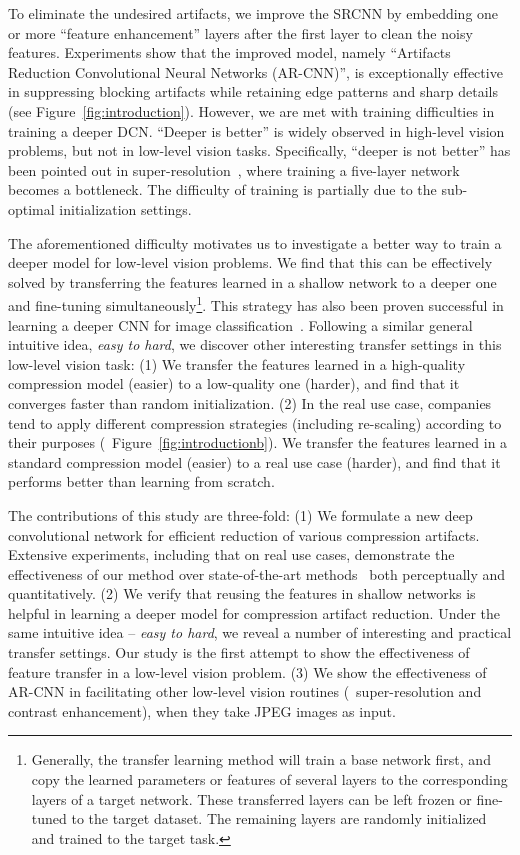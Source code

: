 \documentclass[10pt,twocolumn,letterpaper]{article}
\begin{document}
To eliminate the undesired artifacts, we improve the SRCNN by embedding one or more ``feature enhancement'' layers after the first layer to clean the noisy features. Experiments show that the improved model, namely ``Artifacts Reduction Convolutional Neural Networks (AR-CNN)'', is exceptionally effective in suppressing blocking artifacts while retaining edge patterns and sharp details (see Figure~\ref{fig:introduction}). However, we are met with training difficulties in training a deeper DCN. ``Deeper is better'' is widely observed in high-level vision problems, but not in low-level vision tasks. Specifically, ``deeper is not better'' has been pointed out in super-resolution~\cite{Dong2014a}, where training a five-layer network becomes a bottleneck. The difficulty of training is partially due to the sub-optimal initialization settings.

The aforementioned difficulty motivates us to investigate a better way to train a deeper model for low-level vision problems. We find that this can be effectively solved by transferring the features learned in a shallow network to a deeper one and fine-tuning simultaneously\footnote{Generally, the transfer learning method will train a base network first, and copy the learned parameters or features of several layers to the corresponding layers of a target network. These transferred layers can be left frozen or fine-tuned to the target dataset. The remaining layers are randomly initialized and trained to the target task.}. This strategy has also been proven successful in learning a deeper CNN for image classification~\cite{Simonyan2014}.
Following a similar general intuitive idea, \textit{easy to hard}, we discover other interesting transfer settings in this low-level vision task:
(1) We transfer the features learned in a high-quality compression model (easier) to a low-quality one (harder), and find that it converges faster than random initialization.
(2) In the real use case, companies tend to apply different compression strategies (including re-scaling) according to their purposes (\eg~Figure~\ref{fig:introductionb}). We transfer the features learned in a standard compression model (easier) to a real use case (harder), and find that it performs better than learning from scratch.


The contributions of this study are three-fold:
(1) We formulate a new deep convolutional network for efficient reduction of various compression artifacts.
Extensive experiments, including that on real use cases,
demonstrate the effectiveness of our method over state-of-the-art methods~\cite{Foi2007,Jancsary2012} both perceptually and quantitatively.
(2) We verify that reusing the features in shallow networks is helpful in learning a deeper model for compression artifact reduction. Under the same intuitive idea -- \textit{easy to hard}, we reveal a number of interesting and practical transfer settings. Our study is the first attempt to show the effectiveness of feature transfer in a low-level vision problem.
(3) We show the effectiveness of AR-CNN in facilitating other low-level vision routines (\ie~super-resolution and contrast enhancement), when they take JPEG images as input.
\end{document}
